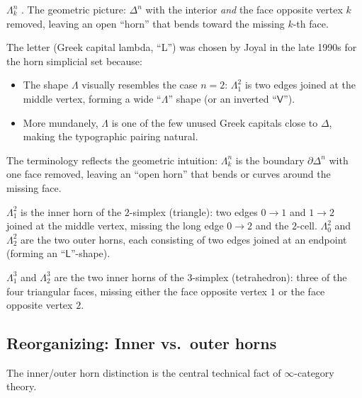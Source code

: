 \begin{howtosay}
$\Lambda^n_k$ .
The geometric picture: $\Delta^n$ with the interior \emph{and} the face
opposite vertex $k$ removed, leaving an open ``horn'' that bends toward
the missing $k$-th face.
\end{howtosay}

\begin{nameorigin}
The letter \term{$\Lambda$} (Greek capital lambda, ``L'') was chosen by
Joyal in the late 1990s for the horn simplicial set because:
\begin{itemize}
  \item The shape $\Lambda$ visually resembles the case $n = 2$:
        $\Lambda^2_1$ is two edges joined at the middle vertex,
        forming a wide ``$\Lambda$'' shape (or an inverted ``$\mathsf{V}$'').
  \item More mundanely, $\Lambda$ is one of the few unused Greek
        capitals close to $\Delta$, making the typographic pairing
        natural.
\end{itemize}
The terminology  reflects the geometric intuition: $\Lambda^n_k$
is the boundary $\partial\Delta^n$ with one face removed, leaving an
``open horn'' that bends or curves around the missing face.
\end{nameorigin}

\begin{example_thm}
\label{ex:horns-low}
$\Lambda^2_1$ is the inner horn of the $2$-simplex (triangle): two edges
$0 \to 1$ and $1 \to 2$ joined at the middle vertex, missing the long
edge $0 \to 2$ and the $2$-cell. $\Lambda^2_0$ and $\Lambda^2_2$ are the
two outer horns, each consisting of two edges joined at an endpoint
(forming an ``$\mathsf{L}$''-shape).

$\Lambda^3_1$ and $\Lambda^3_2$ are the two inner horns of the
$3$-simplex (tetrahedron): three of the four triangular faces, missing
either the face opposite vertex $1$ or the face opposite vertex $2$.
\end{example_thm}

\subsection{Reorganizing: Inner vs.\ outer horns}

The inner/outer horn distinction is the central technical fact of
$\infty$-category theory.

